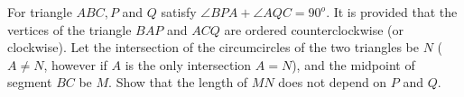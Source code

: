 For triangle $ABC, P$ and $Q$ satisfy $\angle BPA + \angle AQC = 90^o$. It is provided that the vertices of the triangle $BAP$  and $ACQ$ are ordered counterclockwise (or clockwise). Let the intersection of the circumcircles of the two triangles be $N$ ($A \ne N$, however if $A$ is the only intersection $A = N$), and the midpoint of segment $BC$ be $M$. Show that the length of $MN$ does not depend on $P$ and $Q$.